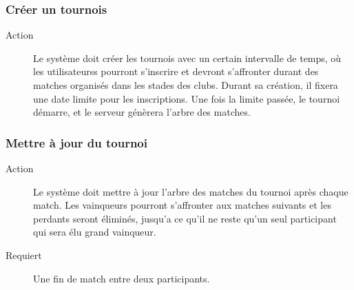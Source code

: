 \documentclass[a4paper]{article}
\begin{document}
\subsubsection{Créer un tournois}
\begin{description}
\item[Action] Le système doit créer les tournois avec un certain intervalle de temps, où les \glspl{utilisateur}s pourront s'inscrire et devront s'affronter durant des matches organisés dans les stades des \glspl{club}.
Durant sa création, il fixera une date limite pour les inscriptions. Une fois la limite passée, le tournoi démarre, et le serveur génèrera l'arbre des matches. %
\end{description}

\subsubsection{Mettre à jour du tournoi}
\begin{description}
\item[Action] Le système doit mettre à jour l'arbre des matches du tournoi après chaque match. Les vainqueurs pourront s'affronter aux matches suivants et les perdants seront éliminés, jusqu'a ce qu'il ne reste qu'un seul participant qui sera élu grand vainqueur.
\item[Requiert] Une fin de match entre deux participants.
\end{description}
\end{document}
